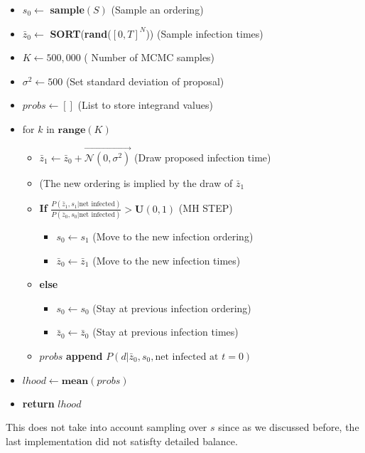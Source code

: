 \documentclass{article}
\begin{document}
\begin{itemize}
\item $s_0 \leftarrow $ \textbf{sample}$(S)$ (Sample an ordering)
\item $\bar{z}_0 \leftarrow$ \textbf{SORT}(\textbf{rand}($[0, T]^N$)) (Sample infection times)
\item $K \leftarrow 500,000$ ( Number of MCMC samples)
\item $\sigma^2 \leftarrow 500$ (Set standard deviation of proposal)
\item $probs \leftarrow []$ (List to store integrand values)
\item for $k$ in $\textbf{range}(K)$
\begin{itemize}
\item $\bar{z}_1 \leftarrow  \bar{z}_0 + \overrightarrow{\mathcal{N}(0, \sigma^2)}$ (Draw proposed infection time)
\item (The new ordering is implied by the draw of $\bar{z}_1$
\item \textbf{If} $\frac{P(\bar{z}_1, s_1 | \text{net infected})}{P(\bar{z}_0, s_0 | \text{net infected})} > \mathbf{U}(0,1)$ (MH STEP)
\begin{itemize}
\item $s_0 \leftarrow s_1$ (Move to the new infection ordering)
\item $\bar{z}_0  \leftarrow \bar{z}_1$ (Move to the new infection times)
\end{itemize}
\item \textbf{else}
\begin{itemize}
\item $s_0 \leftarrow s_0$ (Stay at previous infection ordering)
\item $\bar{z}_0 \leftarrow \bar{z}_0$     (Stay at previous infection times)
\end{itemize}
\item $probs$ \textbf{append} $P(d | \bar{z}_0, s_0,  \text{net infected at } t=0)$
\end{itemize}
\item $lhood \leftarrow \textbf{mean}(probs)$
\item \textbf{return }$lhood$
\end{itemize}

This does not take into account sampling over $s$ since as we discussed before, the last implementation did not satisfty detailed balance.

\end{document}
